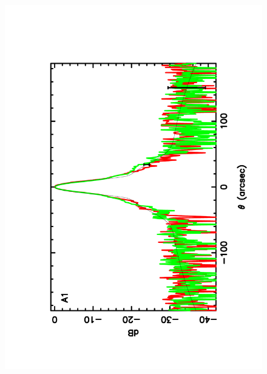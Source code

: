 \begin{figure}[h]
\begin{center}
\includegraphics[clip, angle=-90, scale =0.3]{Figures/Array_A1_dB.pdf}

\end{center}
\end{figure}
